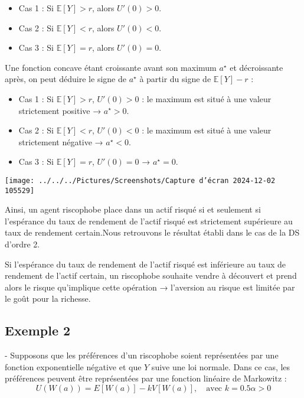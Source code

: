 \documentclass[a4paper, 12pt]{report}
\begin{document}
\begin{itemize}
	\item Cas 1 : Si \( \mathbb{E}[Y] > r \), alors \( U'(0) > 0 \).
	\item Cas 2 : Si \( \mathbb{E}[Y] < r \), alors \( U'(0) < 0 \).
	\item Cas 3 : Si \( \mathbb{E}[Y] = r \), alors \( U'(0) = 0 \).
\end{itemize}

Une fonction concave étant croissante avant son maximum \( a^{\star} \) et décroissante après, on peut déduire le signe de \( a^{\star} \) à partir du signe de \( \mathbb{E}[Y] - r \) :

\begin{itemize}
	\item Cas 1 : Si \( \mathbb{E}[Y] > r \), \( U'(0) > 0 \) : le maximum est situé à une valeur strictement positive → \( a^{\star} > 0 \).
	\item Cas 2 : Si \( \mathbb{E}[Y] < r \), \( U'(0) < 0 \) : le maximum est situé à une valeur strictement négative → \( a^{\star} < 0 \).
	\item Cas 3 : Si \( \mathbb{E}[Y] = r \), \( U'(0) = 0 \) → \(a^{\star} = 0 \).
\end{itemize}

\begin{center}
	\texttt{[image: ../../../Pictures/Screenshots/Capture d'écran 2024-12-02 105529]}
\end{center}

Ainsi, un agent riscophobe place dans un actif risqué si et seulement si l'espérance du taux de rendement de l'actif risqué est strictement supérieure au taux de rendement certain.Nous retrouvons le résultat établi dans le cas de la DS d'ordre 2.

Si l'espérance du taux de rendement de l'actif risqué est inférieure au taux de rendement de l'actif certain, un riscophobe souhaite vendre à découvert et prend alors le risque qu'implique cette opération → l'aversion au risque est limitée par le goût pour la richesse.

\subsection{Exemple 2}

- Supposons que les préférences d'un riscophobe soient représentées par une fonction exponentielle négative et que \( Y \) suive une loi normale. Dans ce cas, les préférences peuvent être représentées par une fonction linéaire de Markowitz :
\[
U(W(a)) = E[W(a)] - kV[W(a)], \quad \text{avec } k = 0.5\alpha > 0
\]
\end{document}
